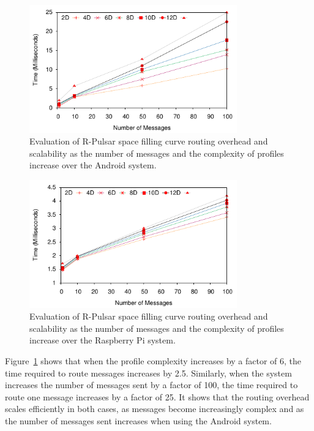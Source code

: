 \begin{figure}[h!]
  \centering
  \includegraphics[width=0.8\textwidth]{Results/Phone}
  \caption{Evaluation of R-Pulsar space filling curve routing overhead and scalability as the number of messages and the complexity of profiles increase over the Android system.}
  \label{fig:Phone}
\end{figure}

\begin{figure}[h!]
  \centering
  \includegraphics[width=0.8\textwidth]{Results/Raspberry}
  \caption{Evaluation of R-Pulsar space filling curve routing overhead and scalability as the number of messages and the complexity of profiles increase over the Raspberry Pi system.}
  \label{fig:Raspberri}
\end{figure}

Figure~\ref{fig:Phone} shows that when the profile complexity increases by a factor of 6, the time required to route messages increases by 2.5. Similarly, when the system increases the number of messages sent by a factor of 100, the time required to route one message increases by a factor of 25. It shows that the routing overhead scales efficiently in both cases, as messages become increasingly complex and as the number of messages sent increases when using the Android system. 

